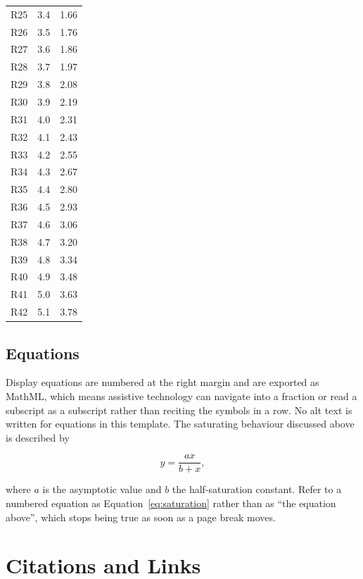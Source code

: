 \begin{longtable}{lrr}
  R25 & 3.4 & 1.66 \\ R26 & 3.5 & 1.76 \\ R27 & 3.6 & 1.86 \\
  R28 & 3.7 & 1.97 \\ R29 & 3.8 & 2.08 \\ R30 & 3.9 & 2.19 \\
  R31 & 4.0 & 2.31 \\ R32 & 4.1 & 2.43 \\ R33 & 4.2 & 2.55 \\
  R34 & 4.3 & 2.67 \\ R35 & 4.4 & 2.80 \\ R36 & 4.5 & 2.93 \\
  R37 & 4.6 & 3.06 \\ R38 & 4.7 & 3.20 \\ R39 & 4.8 & 3.34 \\
  R40 & 4.9 & 3.48 \\ R41 & 5.0 & 3.63 \\ R42 & 5.1 & 3.78 \\
\end{longtable}

\subsection{Equations}

Display equations are numbered at the right margin and are exported as MathML,
which means assistive technology can navigate into a fraction or read a
subscript as a subscript rather than reciting the symbols in a row. No alt
text is written for equations in this template. The saturating behaviour
discussed above is described by

\begin{equation}
  y = \frac{a x}{b + x},
  \label{eq:saturation}
\end{equation}

where $a$ is the asymptotic value and $b$ the half-saturation constant.
Refer to a numbered equation as Equation~\eqref{eq:saturation} rather than as
``the equation above'', which stops being true as soon as a page break moves.

\section{Citations and Links}


